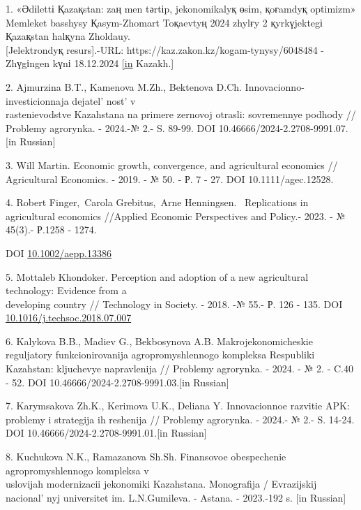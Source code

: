 \begin{references}
1. «Әdіlettі Қazaқstan: zaң men tәrtіp, jekonomikalyқ өsіm, қoғamdyқ
optimizm» Memleket basshysy Қasym-Zhomart Toқaevtyң 2024 zhylғy 2
қyrkүjektegі Қazaқstan halқyna Zholdauy. \\{[}Jelektrondyқ resurs{]}.-URL:
https://kaz.zakon.kz/kogam-tynysy/6048484 - Zhүgіngen kүnі 18.12.2024
\href{https://kaz.zakon.kz/kogam-tynysy/6048484.\%20\%20\%20\%5bin}{{[}in}
Kazakh.{]}

2. Ajmurzina B.T., Kamenova M.Zh., Bektenova D.Ch.
Innovacionno-investicionnaja
dejatel' nost'{} v \\rastenievodstve
Kazahstana na primere zernovoj otrasli: sovremennye podhody // Problemy
agrorynka. - 2024.-№ 2.- S. 89-99. DOI
10.46666/2024-2.2708-9991.07.{[}in Russian{]}

3. Will Martin. Economic growth, convergence, and agricultural economics
// Agricultural Economics. - 2019. - № 50. - Р. 7 - 27. DOI
10.1111/agec.12528.

4. Robert Finger,~Carola Grebitus,~Arne Henningsen. ~Replications in
agricultural economics //Applied Economic Perspectives and Policy.-
2023. - № 45(3).- Р.1258 - 1274.

DOI \href{https://doi.org/10.1002/aepp.13386}{10.1002/aepp.13386}

5. Mottaleb Khondoker. Perception and adoption of a new agricultural
technology: Evidence from a \\developing country // Technology in Society.
- 2018. -№ 55.- Р. 126 - 135.
DOI \\\href{http://dx.doi.org/10.1016/j.techsoc.2018.07.007}{10.1016/j.techsoc.2018.07.007}

6. Kalykova B.B., Madiev G., Bekbosynova A.B. Makrojekonomicheskie
reguljatory funkcionirovanija agropromyshlennogo kompleksa Respubliki
Kazahstan: kljuchevye napravlenija // Problemy agrorynka. - 2024. - № 2.
- C.40 - 52. DOI 10.46666/2024-2.2708-9991.03.{[}in Russian{]}

7. Karymsakova Zh.K., Kerimova U.K., Deliana Y. Innovacionnoe razvitie
APK: problemy i strategija ih reshenija // Problemy agrorynka. - 2024.-
№ 2.- S. 14-24. DOI 10.46666/2024-2.2708-9991.01.{[}in Russian{]}

8. Kuchukova N.K., Ramazanova Sh.Sh. Finansovoe obespechenie
agropromyshlennogo kompleksa v \\uslovijah modernizacii jekonomiki
Kazahstana. Monografija / Evrazijskij nacional' nyj
universitet im. L.N.Gumileva. - Astana. - 2023.-192 s. {[}in Russian{]}


\end{references}
